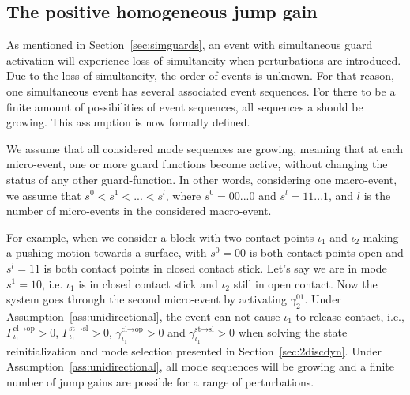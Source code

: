 \documentclass[../DC2017114Bouma.tex]{subfiles}
\begin{document}
\subsection{The positive homogeneous jump gain}
As mentioned in Section~\ref{sec:simguards}, an event with simultaneous guard activation will experience loss of simultaneity when perturbations are introduced. Due to the loss of simultaneity, the order of events is unknown. For that reason, one simultaneous event has several associated event sequences. For there to be a finite amount of possibilities of event sequences, all sequences a should be growing. This assumption is now formally defined.

\begin{myass}\label{ass:unidirectional}
We assume that all considered mode sequences are growing, meaning that at each micro-event, one or more guard functions become active, without changing the status of any other guard-function. In other words, considering one macro-event, we assume that $s^0<s^1<...<s^l$, where $s^0= 00...0$ and $s^l = 11...1$, and $l$ is the number of micro-events in the considered macro-event.
\end{myass}

For example, when we consider a block with two contact points $\iota_1$ and $\iota_2$ making a pushing motion towards a surface, with $s^0 = 00$ is both contact points open and $s^l = 11$ is both contact points in closed contact stick. Let's say we are in mode $s^1 = 10$, i.e. $\iota_1$ is in closed contact stick and $\iota_2$ still in open contact. Now the system goes through the second micro-event by activating $\gamma^01_2$. Under Assumption~\ref{ass:unidirectional}, the event can not cause $\iota_1$ to release contact, i.e., $\Gamma_{\iota_1}^{\text{cl}\rightarrow\text{op}}>0$, $\Gamma_{\iota_1}^{\text{st}\rightarrow\text{sl}}>0$, $\gamma_{\iota_1}^{\text{cl}\rightarrow\text{op}}>0$ and $\gamma_{\iota_1}^{\text{st}\rightarrow\text{sl}}>0$ when solving the state reinitialization and mode selection presented in Section~\ref{sec:2discdyn}. Under Assumption~\ref{ass:unidirectional}, all mode sequences will be growing and a finite number of jump gains are possible for a range of perturbations. 
\end{document}
